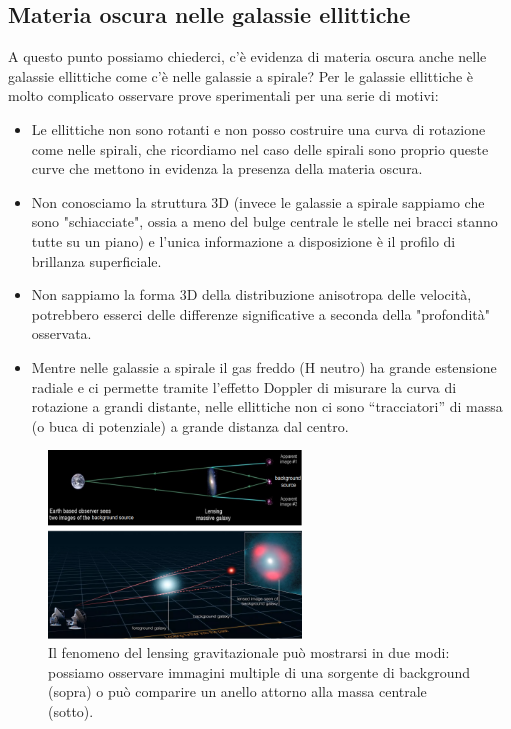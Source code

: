 \subsection{Materia oscura nelle galassie ellittiche}
A questo punto possiamo chiederci, c’è evidenza di materia oscura anche nelle galassie ellittiche come c’è nelle galassie a spirale? Per le galassie ellittiche è molto complicato osservare prove sperimentali per una serie di motivi:
\begin{itemize}
    \item Le ellittiche non sono rotanti e non posso costruire una curva di rotazione come nelle spirali, che ricordiamo nel caso delle spirali sono proprio queste curve che mettono in evidenza la presenza della materia oscura.
    \item Non conosciamo la struttura 3D (invece le galassie a spirale sappiamo che sono "schiacciate", ossia a meno del bulge centrale le stelle nei bracci stanno tutte su un piano) e l’unica informazione a disposizione è il profilo di brillanza superficiale.
    \item Non sappiamo la forma 3D della distribuzione anisotropa delle velocità, potrebbero esserci delle differenze significative a seconda della "profondità" osservata.
    \item Mentre nelle galassie a spirale il gas freddo (H neutro) ha grande estensione radiale e ci permette tramite l'effetto Doppler di misurare la curva di rotazione a grandi distante, nelle ellittiche non ci sono “tracciatori” di massa (o buca di potenziale) a grande distanza dal centro.
\end{itemize} 

\begin{figure}
    \centering
    \includegraphics[width=0.6\textwidth]{immagini/gravitational-lensing.png}
    \caption{Il fenomeno del lensing gravitazionale può mostrarsi in due modi: possiamo osservare immagini multiple di una sorgente di background (sopra) o può comparire un anello attorno alla massa centrale (sotto).}
    \label{fig:gravitational-lensing}
\end{figure}

